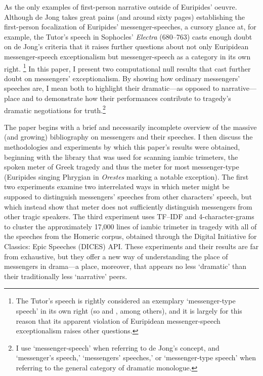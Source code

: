 \documentclass[
]{ceurart}
\begin{document}
As the only examples of first-person narrative outside of Euripides' oeuvre.
Although de Jong takes great pains (and around sixty pages) establishing the
first-person focalization of Euripides' messenger-speeches, a cursory glance
at, for example, the Tutor's speech in Sophocles' \textit{Electra} (680–763)
casts enough doubt on de Jong's criteria that it raises further questions about
not only Euripidean messenger-speech exceptionalism but messenger-speech as a
category in its own right. \footnote{The Tutor's speech is rightly considered
  an exemplary `messenger-type speech' in its own right (so
  \cite{Marshall2006} and \cite{Kells1973}, among others), and it is largely
  for this reason that its apparent violation of Euripidean messenger-speech
exceptionalism raises other questions.} In this paper, I present two
computational null results that cast further doubt on messengers'
exceptionalism. By showing how ordinary messengers' speeches are, I mean both
to highlight their dramatic---as opposed to narrative---place and to
demonstrate how their performances contribute to tragedy's dramatic
negotiations for truth.\footnote{I use `messenger-speech' when referring to
  de Jong's concept, and `messenger's speech,' `messengers' speeches,' or
  `messenger-type speech' when referring to the general category of dramatic
monologue.}

The paper begins with a brief and necessarily incomplete overview of the
massive (and growing) bibliography on messengers and their speeches. I then
discuss the methodologies and experiments by which this paper's results were
obtained, beginning with the library that was used for scanning iambic
trimeters, the spoken meter of Greek tragedy and thus the meter for most
messenger-type (Euripides singing Phrygian in \textit{Orestes} marking a
notable exception). The first two experiments examine two interrelated ways in
which meter might be supposed to distinguish messengers' speeches from other
characters' speech, but which instead show that meter does not sufficiently
distinguish messengers from other tragic speakers. The third experiment uses
TF--IDF and 4-character-grams to cluster the approximately 17,000 lines of
iambic trimeter in tragedy with all of the speeches from the Homeric corpus,
obtained through the Digital Initiative for Classics: Epic Speeches (DICES)
API. These experiments and their results are far from exhaustive, but they
offer a new way of understanding the place of messengers in drama---a place,
moreover, that appears no less `dramatic' than their traditionally less
`narrative' peers.
\end{document}
